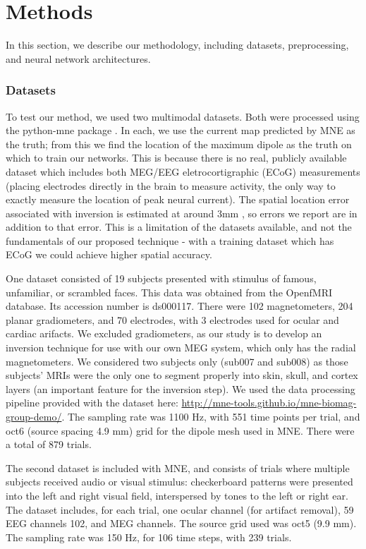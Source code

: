 \documentclass[journal]{IEEEtran}
\begin{document}
\section{Methods}

In this section, we describe our methodology, including datasets, preprocessing, and neural network architectures.

\subsubsection{Datasets}

To test our method, we used two multimodal datasets. Both were processed using the python-mne package \cite{gramfort2014mne}. In each, we use the current map predicted by MNE as the truth; from this we find the location of the maximum dipole as the truth on which to train our networks. This is because there is no real, publicly available dataset which includes both MEG/EEG eletrocortigraphic (ECoG) measurements (placing electrodes directly in the brain to measure activity, the only way to exactly measure the location of peak neural current). The spatial location error associated with inversion is estimated at around 3mm \cite{leahy1998study}, so errors we report are in addition to that error. This is a limitation of the datasets available, and not the fundamentals of our proposed technique - with a training dataset which has ECoG we could achieve higher spatial accuracy.

One dataset \cite{wakeman2015multi} consisted of 19 subjects presented with stimulus of famous, unfamiliar, or scrambled faces. This data was obtained from the OpenfMRI database. Its accession number is ds000117. There were 102 magnetometers, 204 planar gradiometers, and 70 electrodes, with 3 electrodes used for ocular and cardiac arifacts. We excluded gradiometers, as our study is to develop an inversion technique for use with our own MEG system, which only has the radial magnetometers. We considered two subjects only (sub007 and sub008) as those subjects' MRIs were the only one to segment properly into skin, skull, and cortex layers (an important feature for the inversion step). We used the data processing pipeline provided with the dataset here: \url{http://mne-tools.github.io/mne-biomag-group-demo/}. The sampling rate was 1100 Hz, with 551 time points per trial, and oct6 (source spacing 4.9 mm) grid for the dipole mesh used in MNE. There were a total of 879 trials. 

The second dataset \cite{gramfort2013meg} is included with MNE, and consists of trials where multiple subjects received audio or visual stimulus: checkerboard patterns were presented into the left and right visual field, interspersed by tones to the left or right ear. The dataset includes, for each trial, one ocular channel (for artifact removal), 59 EEG channels 102, and MEG channels. The source grid used was oct5 (9.9 mm). The sampling rate was 150 Hz, for 106 time steps, with 239 trials. 
\end{document}
